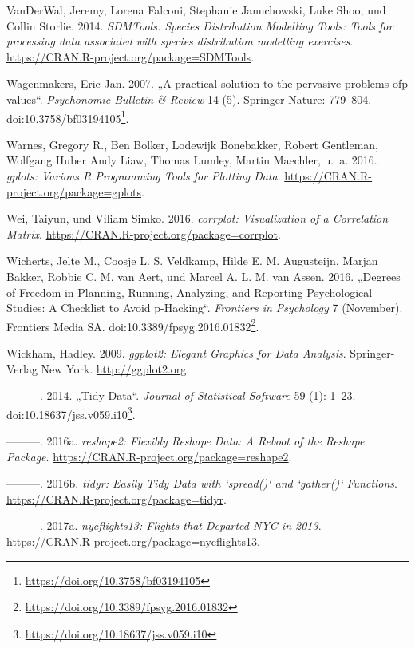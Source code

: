 \documentclass[12pt,ngerman,]{book}
\let\rmarkdownfootnote\footnote%
\def\footnote{\protect\rmarkdownfootnote}
\renewcommand{\href}[2]{#2\footnote{\url{#1}}}
\begin{document}
\hypertarget{ref-R-SDMTools}{}
VanDerWal, Jeremy, Lorena Falconi, Stephanie Januchowski, Luke Shoo, und
Collin Storlie. 2014. \emph{SDMTools: Species Distribution Modelling
Tools: Tools for processing data associated with species distribution
modelling exercises}. \url{https://CRAN.R-project.org/package=SDMTools}.

\hypertarget{ref-Wagenmakers2007}{}
Wagenmakers, Eric-Jan. 2007. „A practical solution to the pervasive
problems ofp values``. \emph{Psychonomic Bulletin \& Review} 14 (5).
Springer Nature: 779--804.
doi:\href{https://doi.org/10.3758/bf03194105}{10.3758/bf03194105}.

\hypertarget{ref-R-gplots}{}
Warnes, Gregory R., Ben Bolker, Lodewijk Bonebakker, Robert Gentleman,
Wolfgang Huber Andy Liaw, Thomas Lumley, Martin Maechler, u.~a. 2016.
\emph{gplots: Various R Programming Tools for Plotting Data}.
\url{https://CRAN.R-project.org/package=gplots}.

\hypertarget{ref-R-corrplot}{}
Wei, Taiyun, und Viliam Simko. 2016. \emph{corrplot: Visualization of a
Correlation Matrix}. \url{https://CRAN.R-project.org/package=corrplot}.

\hypertarget{ref-Wicherts2016}{}
Wicherts, Jelte M., Coosje L. S. Veldkamp, Hilde E. M. Augusteijn,
Marjan Bakker, Robbie C. M. van Aert, und Marcel A. L. M. van Assen.
2016. „Degrees of Freedom in Planning, Running, Analyzing, and Reporting
Psychological Studies: A Checklist to Avoid p-Hacking``. \emph{Frontiers
in Psychology} 7 (November). Frontiers Media SA.
doi:\href{https://doi.org/10.3389/fpsyg.2016.01832}{10.3389/fpsyg.2016.01832}.

\hypertarget{ref-R-ggplot2}{}
Wickham, Hadley. 2009. \emph{ggplot2: Elegant Graphics for Data
Analysis}. Springer-Verlag New York. \url{http://ggplot2.org}.

\hypertarget{ref-tidydata}{}
---------. 2014. „Tidy Data``. \emph{Journal of Statistical Software} 59
(1): 1--23.
doi:\href{https://doi.org/10.18637/jss.v059.i10}{10.18637/jss.v059.i10}.

\hypertarget{ref-R-reshape2}{}
---------. 2016a. \emph{reshape2: Flexibly Reshape Data: A Reboot of the
Reshape Package}. \url{https://CRAN.R-project.org/package=reshape2}.

\hypertarget{ref-R-tidyr}{}
---------. 2016b. \emph{tidyr: Easily Tidy Data with `spread()` and
`gather()` Functions}. \url{https://CRAN.R-project.org/package=tidyr}.

\hypertarget{ref-R-nycflights13}{}
---------. 2017a. \emph{nycflights13: Flights that Departed NYC in
2013}. \url{https://CRAN.R-project.org/package=nycflights13}.
\end{document}
